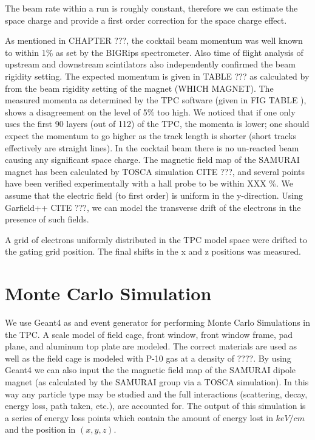 The beam rate within a run is roughly constant, therefore we can estimate the space charge and provide a first order correction for the space charge effect. 

As mentioned in CHAPTER ???, the cocktail beam momentum was well known to within 1\% as set by the BIGRips spectrometer. Also time of flight analysis of upstream and downstream scintilators also independently confirmed the beam rigidity setting. The expected momentum is given in TABLE ??? as calculated by from the beam rigidity setting of the magnet (WHICH MAGNET). The measured momenta as determined by the TPC software (given in FIG TABLE ), shows a disagreement on the level of 5\% too high. We noticed that if one only uses the first 90 layers (out of 112) of the TPC, the momenta is lower; one should expect the momentum to go higher as the track length is shorter (short tracks effectively are straight lines). 
In the cocktail beam there is no un-reacted beam causing any significant space charge. The magnetic field map of the SAMURAI magnet has been calculated by TOSCA simulation CITE ???, and several points have been verified experimentally with a hall probe to be within XXX \%. We assume that the electric field (to first order) is uniform in the y-direction. Using Garfield++ CITE ???, we can model the transverse drift of the electrons in the presence of such fields. 

A grid of electrons uniformly distributed in the TPC model space were drifted to the gating grid position. The final shifts in the x and z positions was measured. 


\section{Monte Carlo Simulation}
We use Geant4 as and event generator for performing Monte Carlo Simulations in the TPC. A scale model of field cage, front window, front window frame, pad plane, and aluminum top plate are modeled. The correct materials are used as well as the field cage is modeled with P-10 gas at a density of ????. By using Geant4 we can also input the the magnetic field map of the SAMURAI dipole magnet (as calculated by the SAMURAI group via a TOSCA simulation).  In this way any particle type may be studied and the full interactions (scattering, decay, energy loss, path taken, etc.), are accounted for. The output of this simulation is a series of energy loss points which contain the amount of energy lost in $keV/cm$ and the position in $(x,y,z)$.

